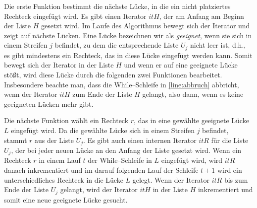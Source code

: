 Die erste Funktion bestimmt die nächste Lücke, in die ein nicht platziertes Rechteck 
eingefügt wird. Es gibt einen Iterator $itH$, der am Anfang am Beginn der Liste $H$ gesetzt wird.
Im Laufe des Algorithmus bewegt sich der Iterator und zeigt auf nächste Lücken.
Eine Lücke bezeichnen wir als \textit{geeignet}, wenn sie sich in einem
Streifen $j$ befindet, zu dem die entsprechende Liste $U_j$ nicht leer ist, d.h., 
es gibt mindestens ein Rechteck, das in diese Lücke eingefügt werden kann.
Somit bewegt sich der Iterator in der Liste $H$ und wenn er auf eine geeignete Lücke 
stößt, wird diese Lücke durch die folgenden zwei Funktionen bearbeitet.
Insbesondere beachte man, dass die While--Schleife in \cref{line:abbruch} abbricht, wenn
der Iterator $itH$ zum Ende der Liste $H$ gelangt, also dann,
wenn es keine geeigneten Lücken mehr gibt. 

Die nächste Funktion wählt ein Rechteck $r$, das in eine gewählte geeignete Lücke $L$
eingefügt wird. Da die gewählte Lücke sich in einem Streifen $j$ befindet, stammt $r$
aus der Liste $U_j$.
Es gibt auch einen internen Iterator $itR$ für die Liste $U_j$,
der bei jeder neuen Lücke an den Anfang der Liste gesetzt wird.
Wenn ein Rechteck $r$ in einem Lauf $t$ der While--Schleife in $L$ eingefügt wird,
wird $itR$ danach inkrementiert und im darauf folgenden Lauf der 
Schleife $t+1$ wird ein unterschiedliches Rechteck in die Lücke $L$ gelegt.
Wenn der Iterator $itR$ bis zum Ende der Liste $U_j$ gelangt, wird der Iterator $itH$
in der Liste $H$ inkrementiert und somit eine neue 
geeignete Lücke gesucht.

